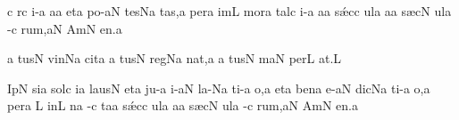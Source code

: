 \divisiominima
\spatium
\custos c
\lineaproxima
{}r\punctum c\egn
\sgn {}i-\punctum a\egn
\sgn {}a{}\punctum a\egn
\spatium
\sgn {}et\punctum a\egn
\spatium
\sgn po-\clivis aN\egn
\sgn tes\pes Na\egn
\sgn ta{s,}\punctum a\egn
\spatium
\divisiominima
\spatium
\sgn per\punctum a\egn
\spatium
\sgn {}im\punctum L\egn
\sgn mor\punctum a\egn
\sgn tal\punctum c\egn
\sgn {}i-\punctum a\egn
\sgn {}a{}\punctum a\egn
\spatium
\sgn s{\'\ae}c\punctum c\egn
\sgn {}ul\punctum a\egn
\sgn {}a{}\punctum a\egn
\spatium
\sgn s{\ae}c\punctum N\egn
\sgn {}ul\punctum a\egn
{}-\punctum c\egn
\sgn ru{m,}\cephalicus aN\egn
\spatium
\divisiofinalis
\spatium
\sgn {}Am\punctum N\egn
\sgn {}e{n.}\punctum a\egn
\spatium
\Finisgregoriana


\bigskip


\Internote
{}
\initiumgregorianum
{}%
\punctum a\egn
\sgn tus\punctum N\egn
\spatium
\sgn v{i}{n}\epiphonus Na\egn
\sgn cit\punctum a\egn
\spatium
\divisiominima
\spatium
{}\punctum a\egn
\sgn tus\punctum N\egn
\spatium
\sgn r{e}{g}\epiphonus Na\egn
\sgn na{t,}\punctum a\egn
\spatium
\divisiominima
\spatium
{}\punctum a\egn
\sgn tus\punctum N\egn
\spatium
\sgn {}{\'\i}m\cephalicus aN\egn
\sgn pe{r}\punctum L\egn
\sgn {}a{t.}\punctum L\egn
\spatium
\Finisgregoriana


\Internote
{}
\initiumgregorianum
\sgn { }Ip\punctum N\egn
\sgn si{}\cantores\punctum a\egn
\spatium
\sgn sol\punctum c\egn
\sgn {}i{}\punctum a\egn
\spatium
\sgn la{us}\punctum N\egn
\spatium
\sgn {}et\punctum a\egn
\spatium
\sgn ju-\punctum a\egn
{}i-\clivis aN\egn
\sgn la-\pes Na\egn
\sgn ti-\punctum a\egn
\sgn {}o{,}\punctum a\egn
\spatium
\divisiominima
\spatium
\sgn {}et\engl{}\punctum a\egn
\spatium
\sgn ben\punctum a\egn
\sgn {}e-\clivis aN\egn
\sgn dic\pes Na\egn
\sgn ti-\punctum a\egn
\sgn {}o{,}\punctum a\egn
\spatium
\divisiominima
\spatium
\sgn per\punctum a\egn
\spatium
\custos L
\lineaproxima
\sgn {}in\punctum L\egn
{}n\punctum a\egn
\sgn {}{\'\i}-\punctum c\egn
\sgn ta{}\punctum a\egn
\spatium
\sgn s{\'\ae}c\punctum c\egn
\sgn {}ul\punctum a\egn
\sgn {}a{}\punctum a\egn
\spatium
\sgn s{\ae}c\punctum N\egn
\sgn {}ul\punctum a\egn
{}-\punctum c\egn
\sgn ru{m,}\cephalicus aN\egn
\spatium
\divisiofinalis
\spatium
\sgn {}Am\punctum N\egn
\sgn {}e{n.}\punctum a\egn
\spatium
\Finisgregoriana

